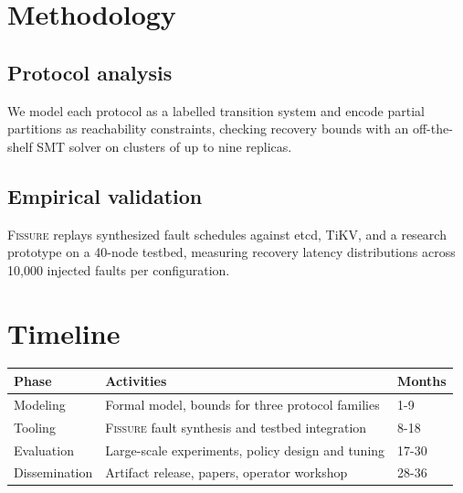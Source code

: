 \documentclass[10pt]{article}
\begin{document}
\section{Methodology}
\subsection{Protocol analysis}
We model each protocol as a labelled transition system and encode partial
partitions as reachability constraints, checking recovery bounds with an
off-the-shelf SMT solver on clusters of up to nine replicas.

\subsection{Empirical validation}
\textsc{Fissure} replays synthesized fault schedules against etcd, TiKV, and a
research prototype on a 40-node testbed, measuring recovery latency
distributions across 10,000 injected faults per configuration.

\section{Timeline}
\begin{tabularx}{\textwidth}{@{}lXl@{}}
\toprule
\textbf{Phase} & \textbf{Activities} & \textbf{Months} \\
\midrule
Modeling      & Formal model, bounds for three protocol families & 1-9 \\
Tooling       & \textsc{Fissure} fault synthesis and testbed integration & 8-18 \\
Evaluation    & Large-scale experiments, policy design and tuning & 17-30 \\
Dissemination & Artifact release, papers, operator workshop & 28-36 \\
\bottomrule
\end{tabularx}
\end{document}

